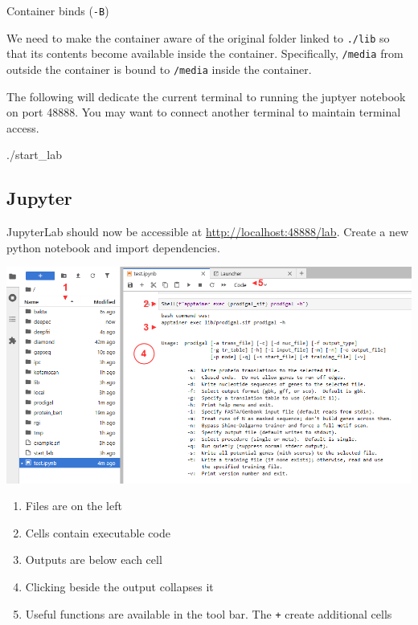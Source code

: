 \documentclass[
]{book}
\newenvironment{Shaded}{\begin{snugshade}}{\end{snugshade}}
\newcommand{\ExtensionTok}[1]{#1}
\providecommand{\tightlist}{%
  \setlength{\itemsep}{0pt}\setlength{\parskip}{0pt}}
\begin{document}
Container binds (\texttt{-B})

We need to make the container aware of the original folder linked to \texttt{./lib} so that its contents become available inside the container.
Specifically, \texttt{/media} from outside the container is bound to \texttt{/media} inside the container.

The following will dedicate the current terminal to running the juptyer notebook on port 48888.
You may want to connect another terminal to maintain terminal access.

\begin{Shaded}
\begin{Highlighting}[]
\ExtensionTok{./start\_lab}
\end{Highlighting}
\end{Shaded}

\subsection{Jupyter}\label{jupyter}

JupyterLab should now be accessible at \url{http://localhost:48888/lab}. Create a new python notebook and import dependencies.

\includegraphics{img/lab3/jupyter.png}

\begin{enumerate}
\def\labelenumi{\arabic{enumi}.}
\tightlist
\item
  Files are on the left
\item
  Cells contain executable code
\item
  Outputs are below each cell
\item
  Clicking beside the output collapses it
\item
  Useful functions are available in the tool bar. The \texttt{+} create additional cells
\end{enumerate}
\end{document}
